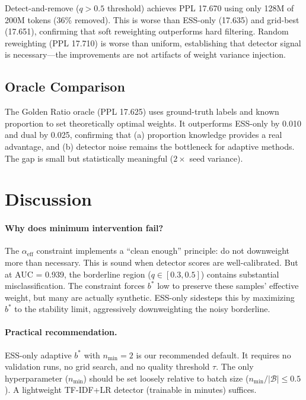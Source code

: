 \documentclass[11pt]{article}
\begin{document}
Detect-and-remove ($q > 0.5$ threshold) achieves PPL 17.670 using only 128M of 200M tokens (36\% removed). This is worse than ESS-only (17.635) and grid-best (17.651), confirming that soft reweighting outperforms hard filtering. Random reweighting (PPL 17.710) is worse than uniform, establishing that detector signal is necessary---the improvements are not artifacts of weight variance injection.

\subsection{Oracle Comparison}

The Golden Ratio oracle (PPL 17.625) uses ground-truth labels and known proportion to set theoretically optimal weights. It outperforms ESS-only by 0.010 and dual by 0.025, confirming that (a) proportion knowledge provides a real advantage, and (b) detector noise remains the bottleneck for adaptive methods. The gap is small but statistically meaningful ($2\times$ seed variance).

\section{Discussion}
\label{sec:discussion}

\paragraph{Why does minimum intervention fail?}
The $\alpha_{\mathrm{eff}}$ constraint implements a ``clean enough'' principle: do not downweight more than necessary. This is sound when detector scores are well-calibrated. But at AUC = 0.939, the borderline region ($q \in [0.3, 0.5]$) contains substantial misclassification. The constraint forces $b^*$ low to preserve these samples' effective weight, but many are actually synthetic. ESS-only sidesteps this by maximizing $b^*$ to the stability limit, aggressively downweighting the noisy borderline.

\paragraph{Practical recommendation.}
ESS-only adaptive $b^*$ with $n_{\min} = 2$ is our recommended default. It requires no validation runs, no grid search, and no quality threshold $\tau$. The only hyperparameter ($n_{\min}$) should be set loosely relative to batch size ($n_{\min}/|\mathcal{B}| \leq 0.5$). A lightweight TF-IDF+LR detector (trainable in minutes) suffices.
\end{document}
